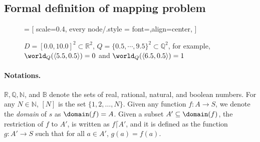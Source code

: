
\subsection{Formal definition of mapping problem}
\label{sec:prelims}

\begin{figure*}[t]
\newcommand{\grid}[2]{\ensuremath{\langle#1,#2\rangle}}

 = [
scale=0.4,
every node/.style = {font=\scriptsize,align=center},
]




\caption{$D = [0.0,10.0]^2 \subset \mathbb{R}^2$, $Q=\{0.5, \cdots, 9.5\}^2 \subset \mathbb{Q}^2$, for example, $\world_Q(\grid{5.5}{0.5}) = 0$ and $\world_Q(\grid{6.5}{0.5}) = 1$}
\end{figure*}

\paragraph{Notations.}
$\mathbb{R}, \mathbb{Q},\mathbb{N}$, and $\mathbb{B}$ denote the sets of real, rational, natural, and boolean numbers.
For any $N \in \mathbb{N}$, $[N]$ is the set $\{1,2,\ldots,N\}$.
%
Given any function $f:A \rightarrow S$, we denote the {\em domain\/} of $s$ as $\domain(f) = A$.
%
Given a subset $A' \subseteq \domain(f)$,
    the restriction of $f$ to $A'$, is written as $f \lceil A'$, and it is defined as the function $g:A' \rightarrow S$ such that for all $a \in A'$, $g(a) = f(a)$.

